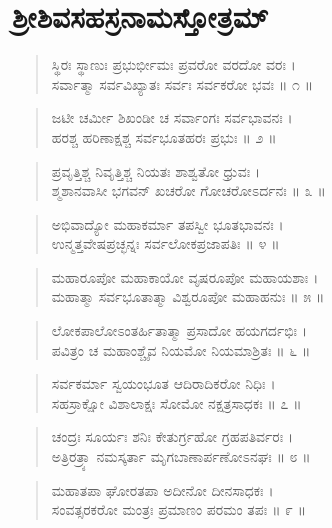 
\chapter{ಶ್ರೀಶಿವಸಹಸ್ರನಾಮಸ್ತೋತ್ರಮ್​}

\begin{verse}
ಸ್ಥಿರಃ ಸ್ಥಾಣುಃ ಪ್ರಭುರ್ಭೀಮಃ ಪ್ರವರೋ ವರದೋ ವರಃ ।\\ಸರ್ವಾತ್ಮಾ ಸರ್ವವಿಖ್ಯಾತಃ ಸರ್ವಃ ಸರ್ವಕರೋ ಭವಃ \num{॥ ೧ ॥}
\end{verse}

\begin{verse}
ಜಟೀ ಚರ್ಮೀ ಶಿಖಂಡೀ ಚ ಸರ್ವಾಂಗಃ ಸರ್ವಭಾವನಃ ।\\ಹರಶ್ಚ ಹರಿಣಾಕ್ಷಶ್ಚ ಸರ್ವಭೂತಹರಃ ಪ್ರಭುಃ \num{॥ ೨ ॥}
\end{verse}

\begin{verse}
ಪ್ರವೃತ್ತಿಶ್ಚ ನಿವೃತ್ತಿಶ್ಚ ನಿಯತಃ ಶಾಶ್ವತೋ ಧ್ರುವಃ ।\\ಶ್ಮಶಾನವಾಸೀ ಭಗವನ್ ಖಚರೋ ಗೋಚರೋಽರ್ದನಃ \num{॥ ೩ ॥}
\end{verse}

\begin{verse}
ಅಭಿವಾದ್ಯೋ ಮಹಾಕರ್ಮಾ ತಪಸ್ವೀ ಭೂತಭಾವನಃ ।\\ಉನ್ಮತ್ತವೇಷಪ್ರಚ್ಛನ್ನಃ ಸರ್ವಲೋಕಪ್ರಜಾಪತಿಃ \num{॥ ೪ ॥}
\end{verse}

\begin{verse}
ಮಹಾರೂಪೋ ಮಹಾಕಾಯೋ ವೃಷರೂಪೋ ಮಹಾಯಶಾಃ ।\\ಮಹಾತ್ಮಾ ಸರ್ವಭೂತಾತ್ಮಾ ವಿಶ್ವರೂಪೋ ಮಹಾಹನುಃ \num{॥ ೫ ॥}
\end{verse}

\begin{verse}
ಲೋಕಪಾಲೋಽಂತರ್ಹಿತಾತ್ಮಾ ಪ್ರಸಾದೋ ಹಯಗರ್ದಭಿಃ ।\\ಪವಿತ್ರಂ ಚ ಮಹಾಂಶ್ಚೈವ ನಿಯಮೋ ನಿಯಮಾಶ್ರಿತಃ \num{॥ ೬ ॥}
\end{verse}

\begin{verse}
ಸರ್ವಕರ್ಮಾ ಸ್ವಯಂಭೂತ ಆದಿರಾದಿಕರೋ ನಿಧಿಃ ।\\ಸಹಸ್ರಾಕ್ಷೋ ವಿಶಾಲಾಕ್ಷಃ ಸೋಮೋ ನಕ್ಷತ್ರಸಾಧಕಃ \num{॥ ೭ ॥}
\end{verse}

\begin{verse}
ಚಂದ್ರಃ ಸೂರ್ಯಃ ಶನಿಃ ಕೇತುರ್ಗ್ರಹೋ ಗ್ರಹಪತಿರ್ವರಃ ।\\ಅತ್ರಿರತ್ರ್ಯಾ ನಮಸ್ಕರ್ತಾ ಮೃಗಬಾಣಾರ್ಪಣೋಽನಘಃ \num{॥ ೮ ॥}
\end{verse}

\begin{verse}
ಮಹಾತಪಾ ಘೋರತಪಾ ಅದೀನೋ ದೀನಸಾಧಕಃ ।\\ಸಂವತ್ಸರಕರೋ ಮಂತ್ರಃ ಪ್ರಮಾಣಂ ಪರಮಂ ತಪಃ \num{॥ ೯ ॥}
\end{verse}

